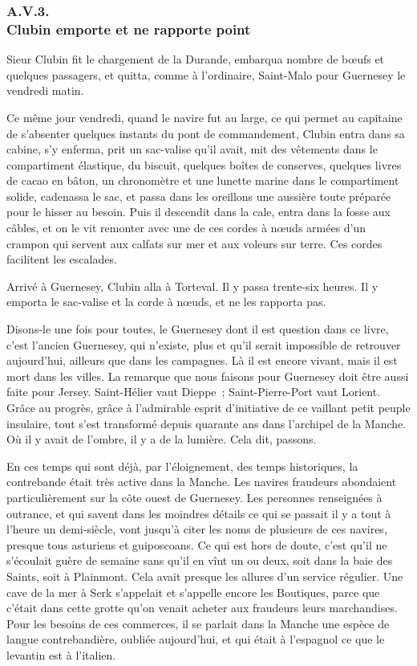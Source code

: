 \documentclass[french,twoside]{book} %
\begin{document}
 \subsubsection[{A.V.3. Clubin emporte et ne rapporte point}]{A.V.3. \\
Clubin emporte et ne rapporte point}
\noindent Sieur Clubin fit le chargement de la Durande, embarqua nombre de bœufs et quelques passagers, et quitta, comme à l’ordinaire, Saint-Malo pour Guernesey le vendredi matin.\par
Ce même jour vendredi, quand le navire fut au large, ce qui permet au capitaine de s’absenter quelques instants du pont de commandement, Clubin entra dans sa cabine, s’y enferma, prit un sac-valise qu’il avait, mit des vêtements dans le compartiment élastique, du biscuit, quelques boîtes de conserves, quelques livres de cacao en bâton, un chronomètre et une lunette marine dans le compartiment solide, cadenassa le sac, et passa dans les oreillons une aussière toute préparée pour le hisser au besoin. Puis il descendit dans la cale, entra dans la fosse aux câbles, et on le vit remonter avec une de ces cordes à nœuds armées d’un crampon qui servent aux calfats sur mer et aux voleurs sur terre. Ces cordes facilitent les escalades.\par
 Arrivé à Guernesey, Clubin alla à Torteval. Il y passa trente-six heures. Il y emporta le sac-valise et la corde à nœuds, et ne les rapporta pas.\par
Disons-le une fois pour toutes, le Guernesey dont il est question dans ce livre, c’est l’ancien Guernesey, qui n’existe, plus et qu’il serait impossible de retrouver aujourd’hui, ailleurs que dans les campagnes. Là il est encore vivant, mais il est mort dans les villes. La remarque que nous faisons pour Guernesey doit être aussi faite pour Jersey. Saint-Hélier vaut Dieppe ; Saint-Pierre-Port vaut Lorient. Grâce au progrès, grâce à l’admirable esprit d’initiative de ce vaillant petit peuple insulaire, tout s’est transformé depuis quarante ans dans l’archipel de la Manche. Où il y avait de l’ombre, il y a de la lumière. Cela dit, passons.\par
En ces temps qui sont déjà, par l’éloignement, des temps historiques, la contrebande était très active dans la Manche. Les navires fraudeurs abondaient particulièrement sur la côte ouest de Guernesey. Les personnes renseignées à outrance, et qui savent dans les moindres détails ce qui se passait il y a tout à l’heure un demi-siècle, vont jusqu’à citer les noms de plusieurs de ces navires, presque tous asturiens et guiposcoans. Ce qui est hors de doute, c’est qu’il ne s’écoulait guère de semaine sans qu’il en vînt un ou deux, soit dans la baie des Saints, soit à Plainmont. Cela avait presque les allures d’un service régulier. Une cave de la mer à Serk s’appelait et s’appelle encore les Boutiques, parce que c’était dans cette grotte qu’on  venait acheter aux fraudeurs leurs marchandises. Pour les besoins de ces commerces, il se parlait dans la Manche une espèce de langue contrebandière, oubliée aujourd’hui, et qui était à l’espagnol ce que le levantin est à l’italien.\par
\end{document}
